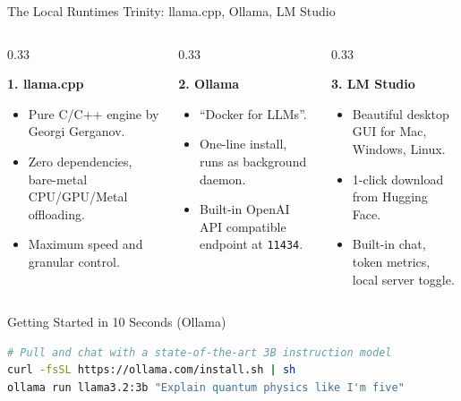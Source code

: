 \documentclass[10pt,aspectratio=169]{beamer}
\begin{document}
\begin{frame}[fragile]{The Local Runtimes Trinity: llama.cpp, Ollama, LM Studio}
    \begin{columns}[T]
        \begin{column}{0.33\textwidth}
            \begin{block}{\textbf{1. llama.cpp}}
                \begin{itemize}
                    \item Pure C/C++ engine by Georgi Gerganov.
                    \item Zero dependencies, bare-metal CPU/GPU/Metal offloading.
                    \item Maximum speed and granular control.
                \end{itemize}
            \end{block}
        \end{column}
        \begin{column}{0.33\textwidth}
            \begin{exampleblock}{\textbf{2. Ollama}}
                \begin{itemize}
                    \item ``Docker for LLMs''.
                    \item One-line install, runs as background daemon.
                    \item Built-in OpenAI API compatible endpoint at \texttt{11434}.
                \end{itemize}
            \end{exampleblock}
        \end{column}
        \begin{column}{0.33\textwidth}
            \begin{alertblock}{\textbf{3. LM Studio}}
                \begin{itemize}
                    \item Beautiful desktop GUI for Mac, Windows, Linux.
                    \item 1-click download from Hugging Face.
                    \item Built-in chat, token metrics, local server toggle.
                \end{itemize}
            \end{alertblock}
        \end{column}
    \end{columns}
    \vspace{0.3cm}
    \begin{block}{Getting Started in 10 Seconds (Ollama)}
\begin{lstlisting}[language=bash]
# Pull and chat with a state-of-the-art 3B instruction model
curl -fsSL https://ollama.com/install.sh | sh
ollama run llama3.2:3b "Explain quantum physics like I'm five"
\end{lstlisting}
    \end{block}
\end{frame}
\end{document}
